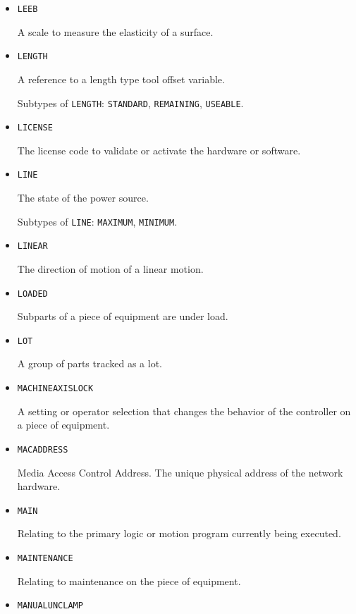 \begin{itemize}
\item \texttt{LEEB}  

A scale to measure the elasticity of a surface.


\item \texttt{LENGTH}  

A reference to a length type tool offset variable.

Subtypes of \texttt{LENGTH}: \texttt{STANDARD}, \texttt{REMAINING}, \texttt{USEABLE}.

\item \texttt{LICENSE}  

The license code to validate or activate the hardware or software.


\item \texttt{LINE}  

The state of the power source.

Subtypes of \texttt{LINE}: \texttt{MAXIMUM}, \texttt{MINIMUM}.

\item \texttt{LINEAR}  

The direction of motion of a linear motion.


\item \texttt{LOADED}  

Subparts of a piece of equipment are under load.


\item \texttt{LOT}  

A group of parts tracked as a lot.


\item \texttt{MACHINE\textunderscore AXIS\textunderscore LOCK}  

A setting or operator selection that changes the behavior of the controller on a piece of equipment.


\item \texttt{MAC\textunderscore ADDRESS}  

Media Access Control Address. The unique physical address of the network hardware.


\item \texttt{MAIN}  

Relating to the primary logic or motion program currently being executed.


\item \texttt{MAINTENANCE}  

Relating to maintenance on the piece of equipment.


\item \texttt{MANUAL\textunderscore UNCLAMP}  


\end{itemize}
